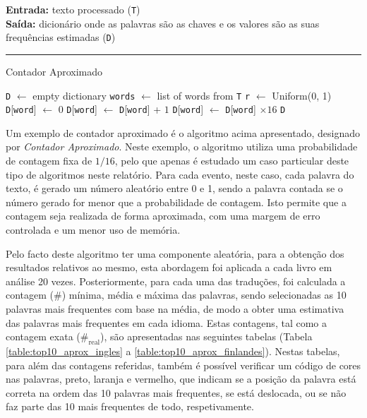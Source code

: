 \documentclass[mirror, portugues]{revdetua}
\begin{document}
\begin{algorithm}[H]
\raggedright
\textbf{Entrada:} texto processado (\texttt{T}) \\
\textbf{Saída:} dicionário onde as palavras são as chaves e os valores são as suas frequências estimadas (\texttt{D})\\
\hrule 
\caption{Contador Aproximado}
\begin{algorithmic}[1]
    \State \texttt{D} $\gets$ empty dictionary
    \State \texttt{words} $\gets$ list of words from \texttt{T}
    \State \texttt{r} $\gets$ Uniform(0, 1)
            \State \texttt{D}[\texttt{word}] $\gets$ 0
        \EndIf
        \State \texttt{D}[\texttt{word}] $\gets$ \texttt{D}[\texttt{word}] + $1$
    \EndIf
    \EndFor
     
    \State \texttt{D}[\texttt{word}] $\gets$ \texttt{D}[\texttt{word}] $\times 16$
    \EndFor
    \State \Return \texttt{D}
\end{algorithmic}
\end{algorithm}

Um exemplo de contador aproximado é o algoritmo acima apresentado, designado por \textit{Contador Aproximado}. Neste exemplo, o algoritmo utiliza uma probabilidade de contagem fixa de $1/16$, pelo que apenas é estudado um caso particular deste tipo de algoritmos neste relatório. Para cada evento, neste caso, cada palavra do texto, é gerado um número aleatório entre 0 e 1, sendo a palavra contada se o número gerado for menor que a probabilidade de contagem. Isto permite que a contagem seja realizada de forma aproximada, com uma margem de erro controlada e um menor uso de memória.

Pelo facto deste algoritmo ter uma componente aleatória, para a obtenção dos resultados relativos ao mesmo, esta abordagem foi aplicada a cada livro em análise 20 vezes. Posteriormente, para cada uma das traduções, foi calculada a contagem (\#) mínima, média e máxima das palavras, sendo selecionadas as 10 palavras mais frequentes com base na média, de modo a obter uma estimativa das palavras mais frequentes em cada idioma. Estas contagens, tal como a contagem exata ($\text{\#}_\text{real}$), são apresentadas nas seguintes tabelas (Tabela \ref{table:top10_aprox_ingles} a \ref{table:top10_aprox_finlandes}). Nestas tabelas, para além das contagens referidas, também é possível verificar um código de cores nas palavras, preto, laranja e vermelho, que indicam se a posição da palavra está correta na ordem das 10 palavras mais frequentes, se está deslocada, ou se não faz parte das 10 mais frequentes de todo, respetivamente.
\end{document}
